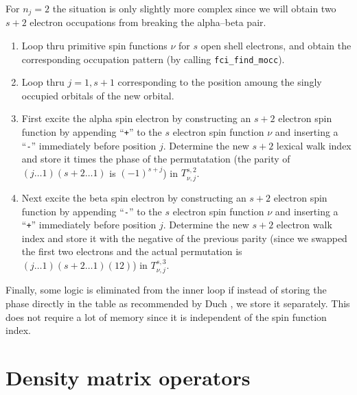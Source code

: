 \documentclass[fullpage,12pt,fleqn]{article}
\begin{document}
For $n_j=2$ the situation is only slightly more complex since we will
obtain two $s+2$ electron occupations from breaking the alpha--beta pair.
\begin{enumerate}
\item Loop thru primitive spin functions $\nu$ for $s$ open shell
electrons, and obtain the corresponding occupation pattern (by calling
\verb!fci_find_mocc!).

\item Loop thru $j=1,s+1$ corresponding to the position amoung the
singly occupied orbitals of the new orbital.

\item First excite the alpha spin electron by constructing an $s+2$
electron spin function by appending ``\verb!+!'' to the $s$ electron
spin function $\nu$ and inserting a ``\verb!-!'' immediately before
position $j$.  Determine the new $s+2$ lexical walk index and store
it times the phase of the permutatation (the parity of $(j \ldots
1)(s+2 \ldots 1)$ is $(-1)^{s+j}$) in $T^{s,2}_{\nu,j}$.

\item Next excite the beta spin electron by constructing an $s+2$
electron spin function by appending ``\verb!-!'' to the $s$ electron
spin function $\nu$ and inserting a ``\verb!+!'' immediately before
position $j$.  Determine the new $s+2$ electron walk index and store
it with the negative of the previous parity (since we swapped the
first two electrons and the actual permutation is $(j \ldots
1)(s+2 \ldots 1)(1 2)$) in $T^{s,3}_{\nu,j}$.
\end{enumerate}

Finally, some logic is eliminated from the inner loop if instead of
storing the phase directly in the table as recommended by Duch
\cite{duchspinad}, we store it separately.  This does not require a
lot of memory since it is independent of the spin function index.  

\section{Density matrix operators}
\end{document}

